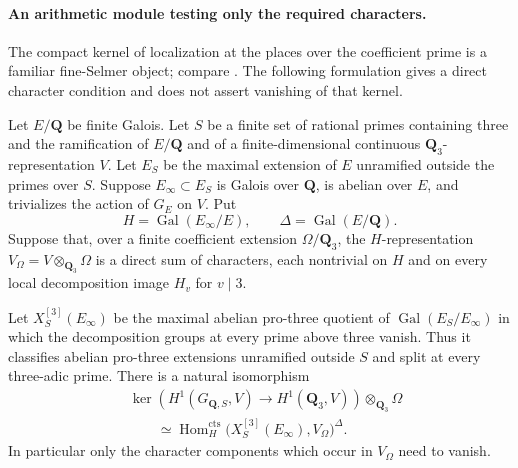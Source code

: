 \paragraph{An arithmetic module testing only the required characters.}
The compact kernel of localization at the places over the coefficient
prime is a familiar fine-Selmer object; compare
\citet[Eq.~(1.2), author p.~2]{WuthrichFineSelmer2007}.
The following formulation gives a direct character condition and
does not assert vanishing of that kernel.

\begin{proposition}
\label{prop:cm-character-localization-condition}
Let \(E/\mathbf Q\) be finite Galois. Let \(S\) be a finite
set of rational primes containing three and the ramification
of \(E/\mathbf Q\) and of a finite-dimensional continuous
\(\mathbf Q_3\)-representation \(V\).
Let \(E_S\) be the maximal extension of \(E\) unramified outside
the primes over \(S\). Suppose \(E_\infty\subset E_S\) is Galois
over \(\mathbf Q\), is abelian over \(E\), and trivializes
the action of \(G_E\) on \(V\). Put
\[
 H=\operatorname{Gal}(E_\infty/E),\qquad
 \Delta=\operatorname{Gal}(E/\mathbf Q).
\]
Suppose that, over a finite coefficient extension
\(\Omega/\mathbf Q_3\), the \(H\)-representation
\(V_\Omega=V\otimes_{\mathbf Q_3}\Omega\) is a direct sum
of characters, each nontrivial on \(H\) and on every local
decomposition image \(H_v\) for \(v\mid3\).

Let \(X_S^{[3]}(E_\infty)\) be the maximal abelian pro-three
quotient of \(\operatorname{Gal}(E_S/E_\infty)\) in which
the decomposition groups at every prime above three vanish.
Thus it classifies abelian pro-three extensions unramified
outside \(S\) and split at every three-adic prime.
There is a natural isomorphism
\begin{equation}
\begin{split}
 &\ker\!\left(H^1(G_{\mathbf Q,S},V)
            \longrightarrow H^1(\mathbf Q_3,V)\right)
                \otimes_{\mathbf Q_3}\Omega\\
 &\qquad\simeq
 \operatorname{Hom}^{\mathrm{cts}}_H
       \bigl(X_S^{[3]}(E_\infty),V_\Omega\bigr)^\Delta.
\end{split}
\label{eq:cm-character-localization-condition}
\end{equation}
In particular only the character components which occur in
\(V_\Omega\) need to vanish.
\end{proposition}
